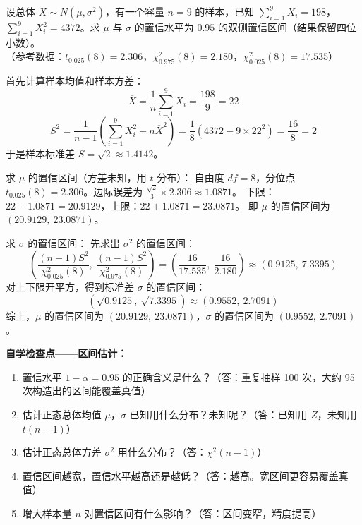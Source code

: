 ﻿\documentclass[lang=cn,11pt]{elegantbook}
\begin{document}
\begin{exercise} \label{prob:ci_6}
设总体 $X\sim N(\mu,\sigma^2)$，有一个容量 $n=9$ 的样本，已知 $\sum_{i=1}^9 X_i=198$，$\sum_{i=1}^9 X_i^2=4372$。求 $\mu$ 与 $\sigma$ 的置信水平为 $0.95$ 的双侧置信区间（结果保留四位小数）。\\
（参考数据：$t_{0.025}(8)=2.306$，$\chi^2_{0.975}(8)=2.180$，$\chi^2_{0.025}(8)=17.535$）
\end{exercise}
\begin{solution}
首先计算样本均值和样本方差：
\begin{equation*}
\overline{X} = \frac{1}{n}\sum_{i=1}^9 X_i = \frac{198}{9} = 22
\end{equation*}
\begin{equation*}
S^2 = \frac{1}{n-1}\left(\sum_{i=1}^9 X_i^2 - n\overline{X}^2\right) = \frac{1}{8}\left(4372 - 9 \times 22^2\right) = \frac{16}{8} = 2
\end{equation*}
于是样本标准差 $S = \sqrt{2} \approx 1.4142$。

求 $\mu$ 的置信区间（方差未知，用 $t$ 分布）：
自由度 $df=8$，分位点 $t_{0.025}(8)=2.306$。边际误差为 $\frac{\sqrt{2}}{3} \times 2.306 \approx 1.0871$。
下限：$22 - 1.0871 = 20.9129$，上限：$22 + 1.0871 = 23.0871$。
即 $\mu$ 的置信区间为 $(20.9129,\ 23.0871)$。

求 $\sigma$ 的置信区间：
先求出 $\sigma^2$ 的置信区间：
\begin{equation*}
\left( \frac{(n-1)S^2}{\chi^2_{0.025}(8)},\ \frac{(n-1)S^2}{\chi^2_{0.975}(8)} \right) = \left( \frac{16}{17.535},\ \frac{16}{2.180} \right) \approx (0.9125,\ 7.3395)
\end{equation*}
对上下限开平方，得到标准差 $\sigma$ 的置信区间：
\begin{equation*}
(\sqrt{0.9125},\ \sqrt{7.3395}) \approx (0.9552,\ 2.7091)
\end{equation*}
综上，$\mu$ 的置信区间为 $(20.9129,\ 23.0871)$，$\sigma$ 的置信区间为 $(0.9552,\ 2.7091)$。
\end{solution}

\begin{note}
\textbf{自学检查点——区间估计：}
\begin{enumerate}
    \item 置信水平 $1-\alpha=0.95$ 的正确含义是什么？（答：重复抽样 100 次，大约 95 次构造出的区间能覆盖真值）
    \item 估计正态总体均值 $\mu$，$\sigma$ 已知用什么分布？未知呢？（答：已知用 $Z$，未知用 $t(n-1)$）
    \item 估计正态总体方差 $\sigma^2$ 用什么分布？（答：$\chi^2(n-1)$）
    \item 置信区间越宽，置信水平越高还是越低？（答：越高。宽区间更容易覆盖真值）
    \item 增大样本量 $n$ 对置信区间有什么影响？（答：区间变窄，精度提高）
\end{enumerate}
\end{note}
\end{document}
